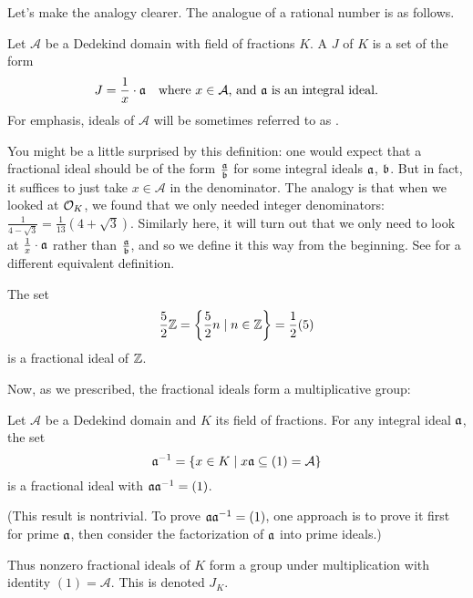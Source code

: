 Let's make the analogy clearer.
The analogue of a rational number is as follows.

\begin{definition}
	Let $\mathcal A$ be a Dedekind domain with field of fractions $K$.
	A  $J$ of $K$ is a set of the form
	\[ J = \frac{1}{x} \cdot \mathfrak a \quad \text{where $x \in \mathcal A$, and $\mathfrak a$ is an integral ideal.} \]
	For emphasis, ideals of $\mathcal A$ will be sometimes referred to as .
\end{definition}

You might be a little surprised by this definition:
one would expect that a fractional ideal should be of the form $\frac{\mathfrak a}{\mathfrak b}$
for some integral ideals $\mathfrak a$, $\mathfrak b$.
But in fact, it suffices to just take $x \in \mathcal A$ in the denominator.
The analogy is that when we looked at $\mathcal O_K$, we found that we only needed
integer denominators: $\frac{1}{4-\sqrt3} = \frac{1}{13}(4+\sqrt3)$.
Similarly here, it will turn out that we only need to look at $\frac1x \cdot \mathfrak a$
rather than $\frac{\mathfrak a}{\mathfrak b}$, and so we define it this way from the beginning.
See  for a different equivalent definition.

\begin{example}
	The set \[ \frac52 \mathbb Z = \left\{ \frac52n \mid n \in \mathbb Z \right\} = \frac{1}{2} (5) \]
	is a fractional ideal of $\mathbb Z$.
\end{example}

Now, as we prescribed, the fractional ideals form a multiplicative group:
\begin{theorem}
	Let $\mathcal A$ be a Dedekind domain and $K$ its field of fractions.
	For any integral ideal $\mathfrak a$, the set
	\[ \mathfrak a^{-1} = \left\{ x \in K
			\mid x\mathfrak a \subseteq (1) = \mathcal A \right\} \]
	is a fractional ideal with $\mathfrak a \mathfrak a^{-1} = (1)$.
\end{theorem}

(This result is nontrivial.
To prove $\mathfrak a \mathfrak a^{-1} = (1)$, one approach is to prove it first
for prime $\mathfrak a$, then consider the factorization of $\mathfrak a$ into prime ideals.)

\begin{definition}
	Thus nonzero fractional ideals of $K$ form a group under multiplication
	with identity $(1) = \mathcal A$.
	This  is denoted $J_K$.
\end{definition}

